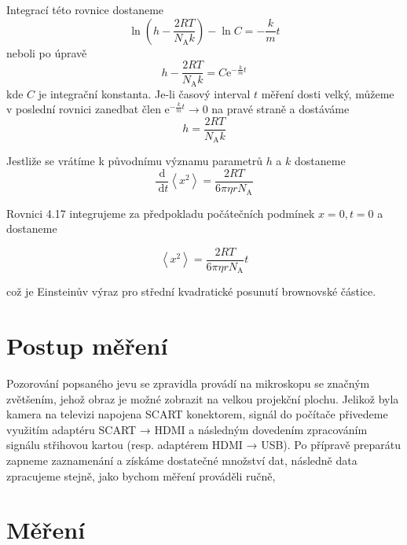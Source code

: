 \documentclass[czech,11pt,a4paper]{article}
\begin{document}
\begin{multicols}{2}
		Integrací této rovnice dostaneme
		$$
		\ln \left(h-\frac{2 R T}{N_{\mathrm{A}} k}\right)-\ln C=-\frac{k}{m} t
		$$
		neboli po úpravě
		$$
		h-\frac{2 R T}{N_{\mathrm{A}} k}=C \mathrm{e}^{-\frac{k}{m} t}
		$$
		kde $C$ je integrační konstanta. Je-li časový interval $t$ měření dosti velký, můžeme v poslední rovnici zanedbat člen $\mathrm{e}^{-\frac{k}{m} t} \rightarrow 0$ na pravé straně a dostáváme
		$$
		h=\frac{2 R T}{N_{\mathrm{A}} k}
		$$
		
		Jestliže se vrátíme k původnímu významu parametrů $h$ a $k$ dostaneme
		$$
		\frac{\mathrm{d}}{\mathrm{~d} t}\left\langle x^{2}\right\rangle=\frac{2 R T}{6 \pi \eta r N_{\mathrm{A}}}
		$$
		
		Rovnici 4.17 integrujeme za předpokladu počátečních podmínek $x=0, t=0$ a dostaneme
		
	\begin{equation}
			\left\langle x^{2}\right\rangle=\frac{2 R T}{6 \pi \eta r N_{\mathrm{A}}} t
	\end{equation}
		
		což je Einsteinův výraz pro střední kvadratické posunutí brownovské částice.
		\section{Postup měření}
		Pozorování popsaného jevu se zpravidla provádí na mikroskopu se značným zvětšením, jehož obraz je možné zobrazit na velkou projekční plochu. Jelikož byla kamera na televizi napojena SCART konektorem, signál do počítače přivedeme využitím adaptéru SCART → HDMI a následným dovedením zpracováním signálu střihovou kartou (resp. adaptérem HDMI → USB). Po přípravě preparátu zapneme zaznamenání a získáme dostatečné množství dat, následně data zpracujeme stejně, jako bychom měření prováděli ručně,
		
		\section{Měření}

\end{multicols}
\end{document}
